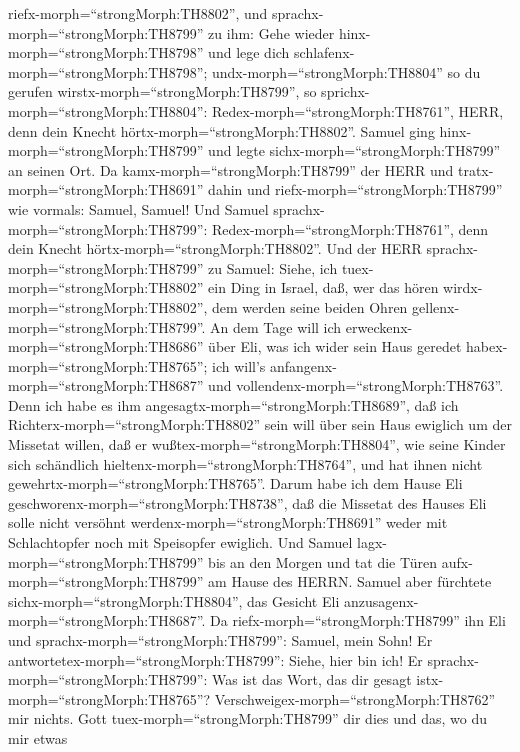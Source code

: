 riefx-morph=``strongMorph:TH8802'',  und
sprachx-morph=``strongMorph:TH8799'' zu ihm: Gehe wieder
hinx-morph=``strongMorph:TH8798'' und lege dich
schlafenx-morph=``strongMorph:TH8798'';
undx-morph=``strongMorph:TH8804'' so du gerufen
wirstx-morph=``strongMorph:TH8799'', so
sprichx-morph=``strongMorph:TH8804'':
Redex-morph=``strongMorph:TH8761'', HERR, denn dein Knecht
hörtx-morph=``strongMorph:TH8802''. Samuel ging
hinx-morph=``strongMorph:TH8799'' und legte
sichx-morph=``strongMorph:TH8799'' an seinen Ort.  Da
kamx-morph=``strongMorph:TH8799'' der HERR und
tratx-morph=``strongMorph:TH8691'' dahin und
riefx-morph=``strongMorph:TH8799'' wie vormals: Samuel, Samuel! Und
Samuel sprachx-morph=``strongMorph:TH8799'':
Redex-morph=``strongMorph:TH8761'', denn dein Knecht
hörtx-morph=``strongMorph:TH8802''.  Und der HERR
sprachx-morph=``strongMorph:TH8799'' zu Samuel: Siehe, ich
tuex-morph=``strongMorph:TH8802'' ein Ding in Israel, daß, wer das hören
wirdx-morph=``strongMorph:TH8802'', dem werden seine beiden Ohren
gellenx-morph=``strongMorph:TH8799''.  An dem Tage will ich
erweckenx-morph=``strongMorph:TH8686'' über Eli, was ich wider sein Haus
geredet habex-morph=``strongMorph:TH8765''; ich will's
anfangenx-morph=``strongMorph:TH8687'' und
vollendenx-morph=``strongMorph:TH8763''.  Denn ich habe es
ihm angesagtx-morph=``strongMorph:TH8689'', daß ich
Richterx-morph=``strongMorph:TH8802'' sein will über sein Haus ewiglich
um der Missetat willen, daß er wußtex-morph=``strongMorph:TH8804'', wie
seine Kinder sich schändlich hieltenx-morph=``strongMorph:TH8764'', und
hat ihnen nicht gewehrtx-morph=``strongMorph:TH8765''. 
Darum habe ich dem Hause Eli geschworenx-morph=``strongMorph:TH8738'',
daß die Missetat des Hauses Eli solle nicht versöhnt
werdenx-morph=``strongMorph:TH8691'' weder mit Schlachtopfer noch mit
Speisopfer ewiglich.  Und Samuel
lagx-morph=``strongMorph:TH8799'' bis an den Morgen und tat die Türen
aufx-morph=``strongMorph:TH8799'' am Hause des HERRN. Samuel aber
fürchtete sichx-morph=``strongMorph:TH8804'', das Gesicht Eli
anzusagenx-morph=``strongMorph:TH8687''.  Da
riefx-morph=``strongMorph:TH8799'' ihn Eli und
sprachx-morph=``strongMorph:TH8799'': Samuel, mein Sohn! Er
antwortetex-morph=``strongMorph:TH8799'': Siehe, hier bin ich!
 Er sprachx-morph=``strongMorph:TH8799'': Was ist das Wort,
das dir gesagt istx-morph=``strongMorph:TH8765''?
Verschweigex-morph=``strongMorph:TH8762'' mir nichts. Gott
tuex-morph=``strongMorph:TH8799'' dir dies und das, wo du mir etwas

